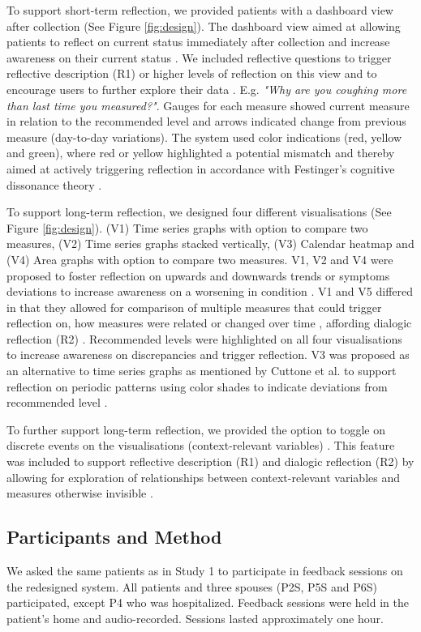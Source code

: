 To support short-term reflection, we provided patients with a dashboard view after collection (See Figure \ref{fig:design}). The dashboard view aimed at allowing patients to reflect on current status immediately after collection and increase awareness on their current status \cite{Cuttone, Muller}. We included reflective questions to trigger reflective description (R1) or higher levels of reflection on this view and to encourage users to further explore their data \cite{Fleck, Muller}. E.g. \textit{"Why are you coughing more than last time you measured?"}. Gauges for each measure showed current measure in relation to the recommended level and arrows indicated change from previous measure (day-to-day variations). The system used color indications (red, yellow and green), where red or yellow highlighted a potential mismatch and thereby aimed at actively triggering reflection in accordance with Festinger's cognitive dissonance theory \cite{Rivera}. 

To support long-term reflection, we designed four different visualisations (See Figure \ref{fig:design}). (V1) Time series graphs with option to compare two measures, (V2) Time series graphs stacked vertically, (V3) Calendar heatmap and (V4) Area graphs with option to compare two measures. V1, V2 and V4 were proposed to foster reflection on upwards and downwards trends or symptoms deviations to increase awareness on a worsening in condition \cite{Rivera}. V1 and V5 differed in that they allowed for comparison of multiple measures that could trigger reflection on, how measures were related or changed over time \cite{Cuttone}, affording dialogic reflection (R2) \cite{Fleck}. Recommended levels were highlighted on all four visualisations to increase awareness on discrepancies \cite{Li2010} and trigger reflection. V3 was proposed as an alternative to time series graphs as mentioned by Cuttone et al. to support reflection on periodic patterns using color shades to indicate deviations from recommended level \cite{Cuttone, Li2010}.  

To further support long-term reflection, we provided the option to toggle on discrete events on the visualisations (context-relevant variables) \cite{Sorensen}. This feature was included to support reflective description (R1) and dialogic reflection (R2) by allowing for exploration of relationships between context-relevant variables and measures otherwise invisible \cite{Fleck}.  

\subsection{Participants and Method}
We asked the same patients as in Study 1 to participate in feedback sessions on the redesigned system. All patients and three spouses (P2S, P5S and P6S) participated, except P4 who was hospitalized. Feedback sessions were held in the patient's home and audio-recorded. Sessions lasted approximately one hour. 

